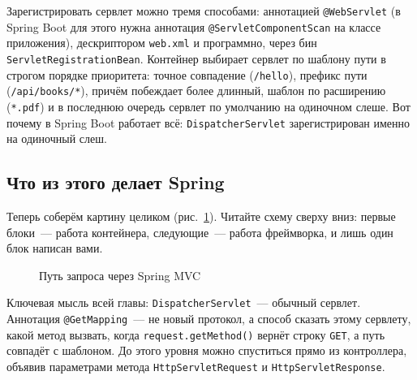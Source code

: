 Зарегистрировать сервлет можно тремя способами: аннотацией \texttt{@WebServlet}
(в Spring Boot для этого нужна аннотация \texttt{@ServletComponentScan} на
классе приложения), дескриптором \texttt{web.xml} и программно, через бин
\texttt{ServletRegistrationBean}. Контейнер выбирает сервлет по шаблону пути в
строгом порядке приоритета: точное совпадение (\texttt{/hello}), префикс пути
(\texttt{/api/books/*}), причём побеждает более длинный, шаблон по расширению
(\texttt{*.pdf}) и в последнюю очередь сервлет по умолчанию на одиночном слеше.
Вот почему в Spring Boot работает всё: \texttt{DispatcherServlet} зарегистрирован
именно на одиночный слеш.

\subsection{Что из этого делает Spring}

Теперь соберём картину целиком (рис.~\ref{fig:08-4}). Читайте схему сверху
вниз: первые блоки~--- работа контейнера, следующие~--- работа фреймворка, и
лишь один блок написан вами.

\begin{figure}[htbp]\centering
{}
\caption{Путь запроса через Spring MVC}\label{fig:08-4}
\end{figure}

Ключевая мысль всей главы: \texttt{DispatcherServlet}~--- обычный сервлет.
Аннотация \texttt{@GetMapping}~--- не новый протокол, а способ сказать этому
сервлету, какой метод вызвать, когда \texttt{request.getMethod()} вернёт строку
\texttt{GET}, а путь совпадёт с шаблоном. До этого уровня можно спуститься
прямо из контроллера, объявив параметрами метода \texttt{HttpServletRequest} и
\texttt{HttpServletResponse}.


